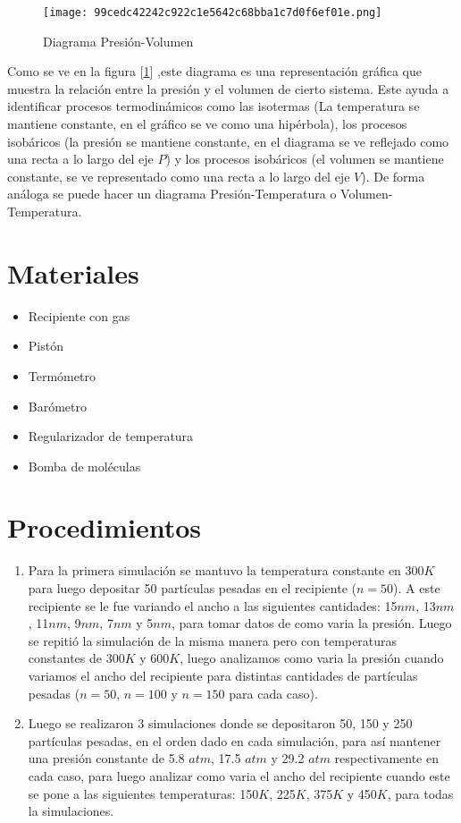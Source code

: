 \documentclass[12pt]{article}
\begin{document}
\begin{figure}[H]
    \centering
    \texttt{[image: 99cedc42242c922c1e5642c68bba1c7d0f6ef01e.png]}  
    \caption{Diagrama Presión-Volumen \parencite{khanacademy_pv_diagrams_2025}}
    \label{diagramaPV}  
\end{figure}
Como se ve en la figura [\ref{diagramaPV}] ,este diagrama es una representación gráfica que muestra la relación entre la presión y el volumen de cierto sistema. Este ayuda a identificar procesos termodinámicos como las isotermas (La temperatura se mantiene constante, en el gráfico se ve como una hipérbola), los procesos isobáricos (la presión se mantiene constante, en el diagrama se ve reflejado como una recta a lo largo del eje $P$) y los procesos isobáricos (el volumen se mantiene constante, se ve representado como una recta a lo largo del eje $V$). De forma análoga se puede hacer un diagrama Presión-Temperatura o Volumen-Temperatura.
\section*{Materiales}
\begin{itemize}
    \item Recipiente con gas
    \item Pistón
    \item Termómetro
    \item Barómetro
    \item Regularizador de temperatura
    \item Bomba de moléculas
\end{itemize}

\section*{Procedimientos}
\begin{enumerate}
    
\item Para la primera simulación se mantuvo la temperatura constante en 300$K$ para luego depositar 50 partículas pesadas en  el recipiente ($n=50$). A este recipiente se le fue variando el ancho a las siguientes cantidades: 15$nm$, 13$nm$, 11$nm$, 9$nm$, 7$nm$ y 5$nm$, para tomar datos de como varia la presión. Luego se repitió la simulación de la misma manera pero con temperaturas constantes de 300$K$ y 600$K$, luego analizamos como varia la presión cuando variamos el ancho del recipiente para distintas cantidades de partículas pesadas ($n=50$, $n=100$ y $n=150$ para cada caso).

\item Luego se realizaron  3  simulaciones donde  se depositaron 50, 150 y 250 partículas pesadas, en el orden dado en cada simulación, para así mantener una presión constante de 5.8 $atm$, 17.5 $atm$ y 29.2 $atm$ respectivamente en cada caso, para luego analizar como varia el ancho del recipiente cuando este se pone a las siguientes temperaturas: 150$K$, 225$K$, 375$K$ y 450$K$, para todas la simulaciones.
\end{enumerate}
\end{document}
